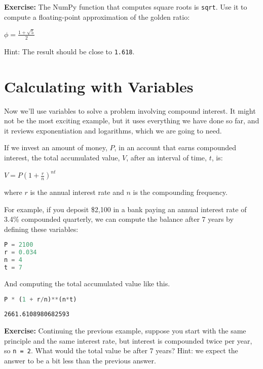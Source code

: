 \textbf{Exercise:} The NumPy function that computes square roots is
\passthrough{\lstinline!sqrt!}. Use it to compute a floating-point
approximation of the golden ratio:

\(\phi = \frac{1 + \sqrt{5}}{2}\)

Hint: The result should be close to \passthrough{\lstinline!1.618!}.

\hypertarget{calculating-with-variables}{%
\section{Calculating with Variables}\label{calculating-with-variables}}

Now we'll use variables to solve a problem involving compound interest.
It might not be the most exciting example, but it uses everything we
have done so far, and it reviews exponentiation and logarithms, which we
are going to need.

If we invest an amount of money, \(P\), in an account that earns
compounded interest, the total accumulated value, \(V\), after an
interval of time, \(t\), is:

\(V=P\left(1+{\frac {r}{n}}\right)^{nt}\)

where \(r\) is the annual interest rate and \(n\) is the compounding
frequency.

For example, if you deposit \$2,100 in a bank paying an annual interest
rate of 3.4\% compounded quarterly, we can compute the balance after 7
years by defining these variables:

\begin{lstlisting}[language=Python,style=source]
P = 2100
r = 0.034
n = 4
t = 7
\end{lstlisting}

And computing the total accumulated value like this.

\begin{lstlisting}[language=Python,style=source]
P * (1 + r/n)**(n*t)
\end{lstlisting}

\begin{lstlisting}[style=output]
2661.6108980682593
\end{lstlisting}

\textbf{Exercise:} Continuing the previous example, suppose you start
with the same principle and the same interest rate, but interest is
compounded twice per year, so \passthrough{\lstinline!n = 2!}. What
would the total value be after 7 years? Hint: we expect the answer to be
a bit less than the previous answer.


